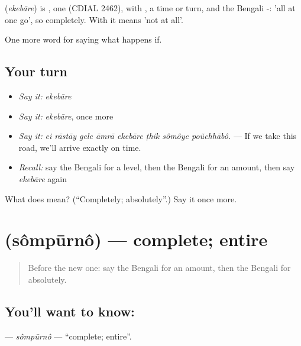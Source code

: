 \begin{cousinweb}
\textbf{} (\emph{ekebāre}) is , one (CDIAL 2462), with , a time or turn, and the Bengali -: 'all at one go', so completely. With  it means 'not at all'.
\end{cousinweb}

\begin{grammarlens}[title={What you've built}]
One more word for saying what happens if.
\end{grammarlens}

\subsection*{Your turn}
\begin{itemize}
\raggedright
  \item \emph{Say it:} \emph{ekebāre}
  \item \emph{Say it:} \emph{ekebāre}, once more
  \item \emph{Say it:} \emph{ei rāstāy gele āmrā ekebāre ṭhik sômôye poũchhābô.} — If we take this road, we'll arrive exactly on time.
  \item \emph{Recall:} say the Bengali for a level, then the Bengali for an amount, then say \emph{ekebāre} again
\end{itemize}

\begin{tcolorbox}[breakable,colback=teal!4,colframe=teal!35!black,title={Before you move on}]
What does  mean? (\textquotedblleft{}Completely; absolutely\textquotedblright{}.) Say it once more.
\end{tcolorbox}
\section[\texorpdfstring{\bn{সম্পূর্ণ} (sômpūrnô)}{সম্পূর্ণ (sômpūrnô)}]{ (sômpūrnô) — complete; entire}

\label{lesson:BN-C373-sompurno}



\begin{quote}
Before the new one: say the Bengali for an amount, then the Bengali for absolutely.
\end{quote}

\subsection*{You'll want to know: }
\textbf{} — \emph{sômpūrnô} — \textquotedblleft{}complete; entire\textquotedblright{}.

